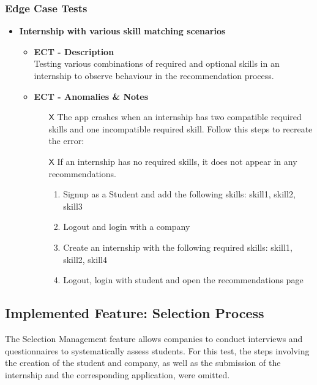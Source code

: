 \subsubsection{Edge Case Tests}
\begin{itemize} [label= {\color{titleColor}\(\diamond\)}]
    \item \textbf{\color{titleColor} Internship with various skill matching scenarios}
    \begin{itemize}
        \item \textbf{\color{titleColor} ECT - Description}\\ Testing various combinations of required and optional skills in an internship to observe behaviour in the recommendation process.
        \item \textbf{\color{titleColor} ECT - Anomalies \& Notes}
        \begin{itemize}
            \item [{\color{titleColor}\(\mathsf{X}\)}] The app crashes when an internship has two compatible required skills and one incompatible required skill. Follow this steps to recreate the error:
            \item [{\color{titleColor}\(\mathsf{X}\)}] If an internship has no required skills, it does not appear in any recommendations.
            \begin{enumerate}
                \item Signup as a Student and add the following skills: skill1, skill2, skill3
                \item Logout and login with a company
                \item Create an internship with the following required skills: skill1, skill2, skill4
                \item Logout, login with student and open the recommendations page
            \end{enumerate}
        \end{itemize} 
    \end{itemize} 
\end{itemize}


\subsection{Implemented Feature: Selection Process}
The Selection Management feature allows companies to conduct interviews and questionnaires to systematically assess students. For this test, the steps involving the creation of the student and company, as well as the submission of the internship and the corresponding application, were omitted.
